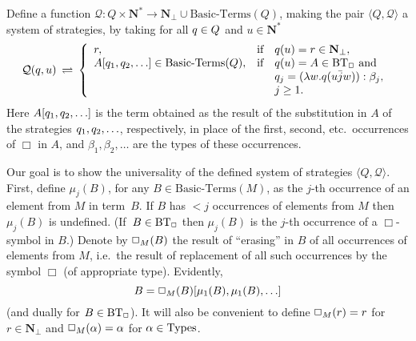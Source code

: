 \documentclass[fleqn]{LMCS}
\theoremstyle{plain}\newtheorem{satz}[thm]{Satz}
\theoremstyle{plain}\newtheorem{hyp}[thm]{Hypothesis}
\theoremstyle{plain}\newtheorem{hyps}[thm]{Hypotheses}
\theoremstyle{definition}\newtheorem{note}[thm]{Note}
\newcommand{\bYdef}{\mathrel{\BYDEF}}
\newcommand{\BYDEF}{\mbox{$\hspace{.2em}\rightleftharpoons\hspace{.2em}$}}
\newcommand{\arr}{\rightarrow}
\newcommand{\la}{\langle}
\newcommand{\ra}{\rangle}
\newcommand{\tuple}[1]{\la #1 \ra}
\newcommand{\NN}{\mathbf{N}}
\newcommand{\Undef}{{\perp}}
\newcommand{\bj}{\bar{j}}
\newcommand{\QQ}{{\mathcal Q}}
\newcommand{\?}{\mbox{?}}
\begin{document}
Define a function $\QQ:Q\times \NN^*\arr \NN_\Undef\cup\mbox{Basic-Terms}(Q)$, 
making the pair $\tuple{Q,\QQ}$ a system of strategies, 
by taking for all 
$q\in Q$ and $u\in\NN^*$
\begin{equation}\label{eq:univ-system-map}\QQ(\qq,u)\bYdef\left\{
\begin{array}{lll}
r,                              & \textrm{if}&\qq(u)=r\in \NN_\Undef, \\
A[\qq_1,\qq_2,\ldots]\in\mbox{Basic-Terms}(Q),& \textrm{if}&\qq(u)=A\in\BT 
                                                                    \textrm{ and}\\
                                                    &            &
q_j=(\lambda w.\qq(u\bj w)):\beta_j,\ \\                     
                                                    &            &                      
                                                                      j\ge1.
\end{array}\right.
\end{equation}
Here $A[q_1,q_2,\ldots]$ 
is the term obtained as the result of the substitution 
in $A$ of the strategies $q_1,q_2,\ldots$, 
respectively, in place of the first, second, etc.\ occurrences of $\Box$ in $A$, and 
$\beta_1,\beta_2,\ldots$ are the types of these occurrences. 


Our goal is to show the universality of the defined system of strategies 
$\tuple{Q,\QQ}$. First, define $\mu_j(B)$, for any $B\in\textrm{Basic-Terms}(M)$, 
as the $j$-th occurrence of an element from $M$ in term~$B$. If $B$ has ${}<j$ 
occurrences of elements from $M$ then $\mu_j(B)$ is undefined. 
(If~$B\in\mbox{BT}_\Box$ then $\mu_j(B)$ is the $j$-th occurrence of a $\Box$-symbol in $B$.)
Denote by 
$\Box_M(B)$ the result of ``erasing'' in $B$ of all occurrences of elements 
from $M$, i.e.\ the result of replacement of all such occurrences by the symbol 
$\Box$ (of appropriate type). 
Evidently, 
\[
B=\Box_M(B)[\mu_1(B),\mu_1(B),\ldots] 
\]
(and dually for $B\in\mbox{BT}_\Box$). 
It will also be convenient to define $\Box_M(r)=r$ for $r\in\NN_\Undef$ 
and $\Box_M(\alpha)=\alpha$ for $\alpha\in\textrm{Types}$. 
\end{document}
